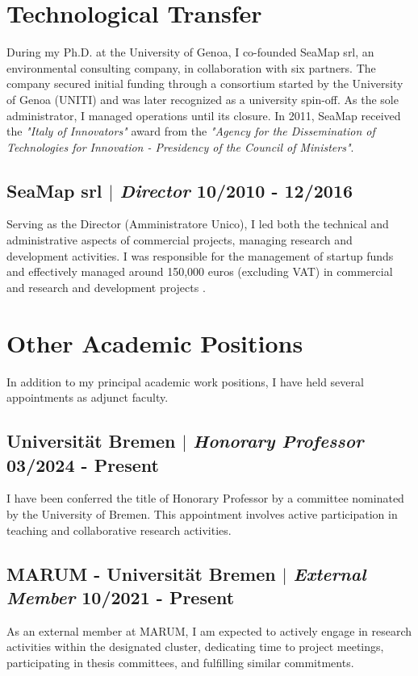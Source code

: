 \documentclass[11pt]{article}
\begin{document}
\section{Technological Transfer}
{\normalfont During my Ph.D. at the University of Genoa, I co-founded SeaMap srl, an environmental consulting company, in collaboration with six partners. The company secured initial funding through a consortium started by the University of Genoa (UNITI) and was later recognized as a university spin-off. As the sole administrator, I managed operations until its closure. In 2011, SeaMap received the \textit{"Italy of Innovators"} award from the \textit{"Agency for the Dissemination of Technologies for Innovation - Presidency of the Council of Ministers"}.}\\
\bigskip

\subsection{SeaMap srl $|$ {\normalfont\textit{Director}} \hfill 10/2010 - 12/2016}
{\footnotesize Serving as the Director (Amministratore Unico), I led both the technical and administrative aspects of commercial projects, managing research and development activities. I was responsible for the management of startup funds and effectively managed around 150,000 euros (excluding VAT) in commercial and research and development projects .}

\section{Other Academic Positions}
{\normalfont In addition to my principal academic work positions, I have held several appointments as adjunct faculty.}\\
\bigskip

\subsection{Universität Bremen $|$ {\normalfont\textit{Honorary Professor}} \hfill 03/2024 - Present}
{\footnotesize I have been conferred the title of Honorary Professor by a committee nominated by the University of Bremen. This appointment involves active participation in teaching and collaborative research activities.}
\bigskip

\subsection{MARUM - Universität Bremen $|$ {\normalfont\textit{External Member}} \hfill 10/2021 - Present}
{\footnotesize As an external member at MARUM, I am expected to actively engage in research activities within the designated cluster, dedicating time to project meetings, participating in thesis committees, and fulfilling similar commitments.}
\bigskip
\end{document}

